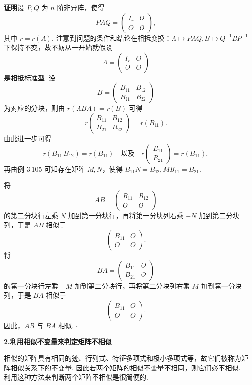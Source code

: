 \documentclass[UTF8, 12pt, fontset=fandol, oneside]{ctexart}
\begin{document}
\noindent\textbf{证明}\quad 设 $P,Q$ 为 $n$ 阶非异阵，使得
\[
PAQ=\left(\begin{array}{cc}
I_r & O\\
O & O
\end{array}\right),
\]
其中 $r=r(A)$. 注意到问题的条件和结论在相抵变换：$A\mapsto PAQ,B\mapsto Q^{-1}BP^{-1}$ 下保持不变，故不妨从一开始就假设
\[
A=\left(\begin{array}{cc}
I_r & O\\
O & O
\end{array}\right)
\]
是相抵标准型. 设
\[
B=\left(\begin{array}{cc}
B_{11} & B_{12}\\
B_{21} & B_{22}
\end{array}\right)
\]
为对应的分块，则由 $r(ABA)=r(B)$ 可得
\[
r\left(\begin{array}{cc}
B_{11} & B_{12}\\
B_{21} & B_{22}
\end{array}\right)=r(B_{11}).
\]
由此进一步可得
\[
r(B_{11}\ B_{12})=r(B_{11})\quad\text{以及}\quad
r\left(\begin{array}{c}
B_{11}\\
B_{21}
\end{array}\right)=r(B_{11}),
\]
再由例 3.105 可知存在矩阵 $M,N$，使得 $B_{11}N=B_{12},MB_{11}=B_{21}$.

将
\[
AB=\left(\begin{array}{cc}
B_{11} & B_{12}\\
O & O
\end{array}\right)
\]
的第二分块行左乘 $N$ 加到第一分块行，再将第一分块列右乘 $-N$ 加到第二分块列，于是 $AB$ 相似于
\[
\left(\begin{array}{cc}
B_{11} & O\\
O & O
\end{array}\right).
\]
将
\[
BA=\left(\begin{array}{cc}
B_{11} & O\\
B_{21} & O
\end{array}\right)
\]
的第一分块行左乘 $-M$ 加到第二分块行，再将第二分块列右乘 $M$ 加到第一分块列，于是 $BA$ 相似于
\[
\left(\begin{array}{cc}
B_{11} & O\\
O & O
\end{array}\right).
\]
因此，$AB$ 与 $BA$ 相似. $\square$

\noindent\textbf{2.\quad 利用相似不变量来判定矩阵不相似}

相似的矩阵具有相同的迹、行列式、特征多项式和极小多项式等，故它们被称为矩阵相似关系下的不变量. 因此若两个矩阵的相似不变量不相同，则它们必不相似. 利用这种方法来判断两个矩阵不相似是很简便的.
\end{document}
